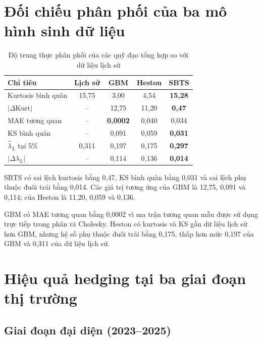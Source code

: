 \section{Đối chiếu phân phối của ba mô hình sinh dữ liệu}
\label{sec:c4-distribution}

\begin{table}[H]
\centering
\small
\caption{Độ trung thực phân phối của các quỹ đạo tổng hợp so với dữ liệu lịch sử}
\label{tab:c4-distributional-fidelity}
\begin{tabular}{@{}lcccc@{}}
\toprule
\textbf{Chỉ tiêu} & \textbf{Lịch sử} & \textbf{GBM} &
\textbf{Heston} & \textbf{SBTS}\\
\midrule
Kurtosis bình quân & 15,75 & 3,00 & 4,54 & \textbf{15,28}\\
$|\Delta\mathrm{Kurt}|$ & -- & 12,75 & 11,20 & \textbf{0,47}\\
MAE tương quan & -- & \textbf{0,0002} & 0,040 & 0,034\\
KS bình quân & -- & 0,091 & 0,059 & \textbf{0,031}\\
$\widehat\lambda_L$ tại 5\% & 0,311 & 0,197 & 0,175 & \textbf{0,297}\\
$|\Delta\lambda_L|$ & -- & 0,114 & 0,136 & \textbf{0,014}\\
\bottomrule
\end{tabular}
\end{table}

SBTS có sai lệch kurtosis bằng 0,47, KS bình quân bằng 0,031 và sai lệch phụ
thuộc đuôi trái bằng 0,014. Các giá trị tương ứng của GBM là 12,75, 0,091 và
0,114; của Heston là 11,20, 0,059 và 0,136.

GBM có MAE tương quan bằng 0,0002 vì ma trận tương quan mẫu được sử dụng trực
tiếp trong phân rã Cholesky. Heston có kurtosis và KS gần dữ liệu lịch sử hơn
GBM, nhưng hệ số phụ thuộc đuôi trái bằng 0,175, thấp hơn mức 0,197 của GBM và
0,311 của dữ liệu lịch sử.

\section{Hiệu quả hedging tại ba giai đoạn thị trường}
\label{sec:c4-performance}

\subsection{Giai đoạn đại diện (2023--2025)}

